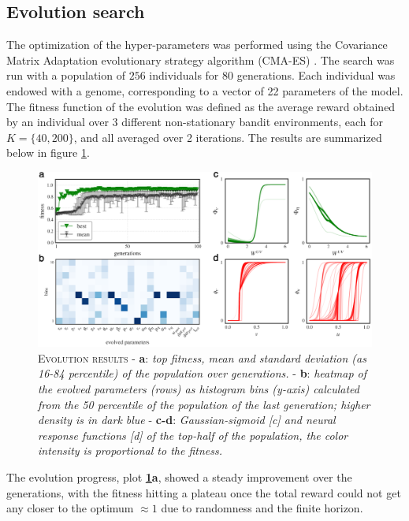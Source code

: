 \subsection{Evolution search}
The optimization of the hyper-parameters was performed using the Covariance Matrix Adaptation evolutionary strategy algorithm (CMA-ES) \cite{igelCovarianceMatrixAdaptation2007}.
The search was run with a population of $256$ individuals for $80$ generations. Each individual was endowed with a genome, corresponding to a vector of 22 parameters of the model.
The fitness function of the evolution was defined as the average reward obtained by an individual over 3 different non-stationary bandit environments, each for $K=\{40, 200\}$, and all averaged over 2 iterations.
The results are summarized below in figure \ref{fig:evolution}.

\begin{figure}[H]
    \centering
    \includegraphics[width=1.0\textwidth]{figures/evolution_comp_1.png}
    \caption{\textsc{Evolution results} - \textbf{a}: \textit{top fitness, mean and standard deviation (as 16-84 percentile) of the population over generations.} - \textbf{b}: \textit{heatmap of the evolved parameters (rows) as histogram bins (y-axis) calculated from the 50 percentile of the
    population of the last generation; higher density is in dark blue} - \textbf{c-d}: \textit{Gaussian-sigmoid [c] and neural response functions [d] of the top-half of the population, the color intensity is proportional to the fitness.}}
    \label{fig:evolution}
\end{figure}

\noindent The evolution progress, plot \textbf{\ref{fig:evolution}a}, showed a steady improvement over the generations, with the fitness hitting a plateau once the total reward could not get any closer to the optimum $\approx 1$ due to randomness and the finite horizon.

